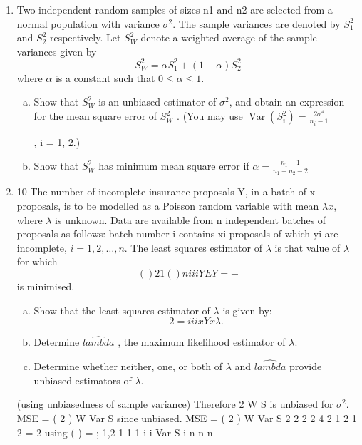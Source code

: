 \documentclass[a4paper,12pt]{article}
\begin{document}
\begin{enumerate}
\item Two independent random samples of sizes n1 and n2 are selected from a normal
population with variance $\sigma^2$. The sample variances are denoted by $S^2_1$ and $S^2_2$
respectively. Let $S^2_W$ denote a weighted average of the sample variances given by
\[ S^2_W = \alpha S^2_1 + (1 - \alpha)S^2_2\]
where $\alpha$ is a constant such that $0 \leq \alpha \leq 1$.
\begin{enumerate}[(a)]
\item Show that $S^2_W$
 is an unbiased estimator of $\sigma^2$, and obtain an expression for
the mean square error of $S^2_W$
 .
(You may use
${ \displaystyle \operatorname{Var}(S^2_i)  = \frac{2 \sigma^4}{n_i - 1} }$ 

, i = 1, 2.) 
\item Show that $S^2_W$
 has minimum mean square error if ${ \displaystyle  \alpha = \frac{n_1 - 1}{ n_1 + n_2 - 2} }$
\end{enumerate}

\item 10 The number of incomplete insurance proposals Y, in a batch of x proposals, is to
be modelled as a Poisson random variable with mean $\lambda x$, where $\lambda$ is unknown.
Data are available from n independent batches of proposals as follows: batch
number i contains xi proposals of which yi are incomplete, $i = 1,2, \ldots, n$.
The least squares estimator of $\lambda$ is that value of $\lambda$for which
\[( )2
1
( )
n
i i
i
Y EY
=
 −\]
is minimised.
\begin{enumerate}[(a)]
\item Show that the least squares estimator of $\lambda$ is given by:
\[2 = i i
i
x Y
x
\lambda
 .\] 
\item Determine $\hat{lambda}$ , the maximum likelihood estimator of $\lambda$. 
\item Determine whether neither, one, or both of $\lambda$ and $\hat{lambda}$ provide unbiased
estimators of $\lambda$. 
\end{enumerate}

\newpage

\newpage
(using unbiasedness of sample variance)
Therefore 2
W S is unbiased for $\sigma^2$. MSE = ( 2 ) W Var S since unbiased.
MSE = ( 2 ) W Var S 2 2 2 2
4 2
1 2
1 2
= 2 using ( ) = ; 1,2
1 1 1 i
i
Var S i
n n n


\end{enumerate}
\end{document}

